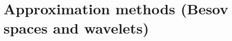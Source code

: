 \documentclass{beamer}
\numberwithin{equation}{section}
\theoremstyle{plain}
\theoremstyle{plain}
\theoremstyle{definition}
\theoremstyle{plain}
\theoremstyle{plain}
\theoremstyle{definition}
\newcommand{\Rl}{\mathbb{R}}
\newcommand{\Cplx}{\mathbb{C}}
\newcommand{\Itgr}{\mathbb{Z}}
\newcommand{\Lc}{\mathcal{L}}
\newcommand{\mf}{\mathfrak{m}}
\begin{document}
%
%
%

\section{Approximation methods (Besov spaces and wavelets)}
\end{document}
